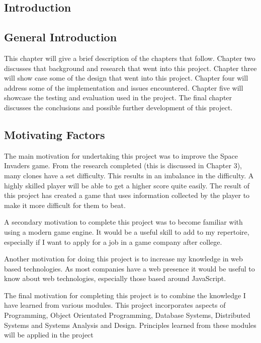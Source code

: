 \documentclass[12pt]{article}
\begin{document}
\newpage
{}



\begin{center}
\section{Introduction}
\end{center}

\begin{center}
\subsection{General Introduction} 
\end{center}
This chapter will give a brief description of the chapters that follow. Chapter two  discusses that background and research that went into this project. Chapter three will show case some of the design that went into this project. Chapter four will address some of the implementation and issues encountered. Chapter five will showcase the testing and evaluation used in the project. The final chapter discusses the conclusions and possible further development of this project.

\begin{center}
\subsection{Motivating Factors}
\end{center}
The main motivation for undertaking this project was to improve the Space Invaders game. From the research completed (this is discussed in Chapter 3), many clones have a set difficulty. This results in an imbalance in the difficulty. A highly skilled player will be able to get a higher score quite easily. The result of this project has created a game that uses information collected by the player to make it more difficult for them to beat. 

A secondary motivation to complete this project was to become familiar with using a modern game engine. It would be a useful skill to add to my repertoire, especially if I want to apply for a job in a game company after college. 

Another motivation for doing this project is to increase my knowledge in web based technologies. As most companies have a web presence it would be useful to know about web technologies, especially those based around JavaScript. 

The final motivation for completing this project is to combine the knowledge I have learned from various modules. This project incorporates aspects of Programming, Object Orientated Programming, Database Systems, Distributed Systems and Systems Analysis and Design. Principles learned from these modules will be applied in the project
\end{document}
